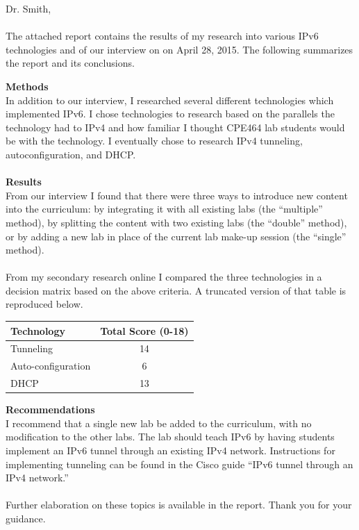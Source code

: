 \documentclass[letterpaper,12pt]{texMemo}
\begin{document}
\thispagestyle{empty}
\maketitle


Dr. Smith,\\\\
The attached report contains the results of my research into various IPv6 technologies and of our interview on on April 28, 2015. The following summarizes the report and its conclusions.

\textbf{Methods}\\
In addition to our interview, I researched several different technologies which implemented IPv6. I chose technologies to research based on the parallels the technology had to IPv4 and how familiar I thought CPE464 lab students would be with the technology. I eventually chose to research IPv4 tunneling, autoconfiguration, and DHCP.\\\\
\textbf{Results}\\
From our interview I found that there were three ways to introduce new content into the curriculum: by integrating it with all existing labs (the ``multiple'' method), by splitting the content with two existing labs (the ``double'' method), or by adding a new lab in place of the current lab make-up session (the ``single'' method).\\\\
From my secondary research online I compared the three technologies in a decision matrix based on the above criteria. A truncated version of that table is reproduced below.

\begin{tabulary}{\textwidth}{|L|C|}
  \hline
  Technology & Total Score (0-18) \\ \hline\hline
  Tunneling          & 14 \\ \hline
  Auto-configuration & 6 \\ \hline
  DHCP               & 13 \\ \hline
\end{tabulary}
\medskip

\textbf{Recommendations}\\
I recommend that a single new lab be added to the curriculum, with no modification to the other labs. The lab should teach IPv6 by having students implement an IPv6 tunnel through an existing IPv4 network. Instructions for implementing tunneling can be found in the Cisco guide ``IPv6 tunnel through an IPv4 network.''\\\\
Further elaboration on these topics is available in the report. Thank you for your guidance.

\end{document}
